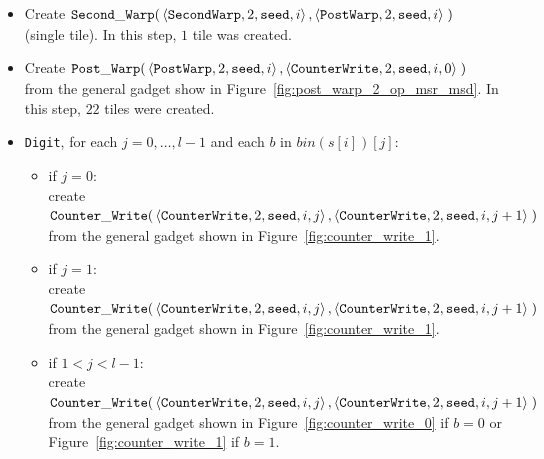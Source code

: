 \begin{itemize}
    \item Create
    $\begin{aligned}[t]
        {\tt Second\_Warp}(&\left\langle {\tt SecondWarp}, 2, {\tt seed}, i \right\rangle,
                     \left\langle {\tt PostWarp},   2, {\tt seed}, i \right\rangle \;)
    \end{aligned}$ \\ (single tile).
    In this step, $1$ tile was created.

    \item Create
    $\begin{aligned}[t]
        {\tt Post\_Warp}(&\left\langle {\tt PostWarp}, 2, {\tt seed}, i    \right\rangle,
                   \left\langle {\tt CounterWrite},    2, {\tt seed}, i, 0 \right\rangle \;)
    \end{aligned}$\\ from the general gadget show in Figure~\ref{fig:post_warp_2_op_msr_msd}.
    In this step, $22$ tiles were created.

    \item {\tt Digit}, for each $j=0,\ldots,l-1$ and each $b$ in $bin(s[i])[j]$:
    \begin{itemize}
        \item if $j = 0$:\\ create
        $\begin{aligned}[t]
            {\tt Counter\_Write}(&\left\langle {\tt CounterWrite}, 2, {\tt seed}, i, j \right\rangle, \left\langle {\tt CounterWrite}, 2, {\tt seed}, i, j + 1 \right\rangle \;)
        \end{aligned}$\\from the general gadget shown in Figure~\ref{fig:counter_write_1}.

        \item if $j = 1$:\\ create
        $\begin{aligned}[t]
            {\tt Counter\_Write}(&\left\langle {\tt CounterWrite}, 2, {\tt seed}, i, j \right\rangle, \left\langle {\tt CounterWrite}, 2, {\tt seed}, i, j + 1 \right\rangle \;)
        \end{aligned}$\\from the general gadget shown in Figure~\ref{fig:counter_write_1}.

        \item if $1 < j < l-1$:\\ create
        $\begin{aligned}[t]
            {\tt Counter\_Write}(&\left\langle {\tt CounterWrite}, 2, {\tt seed}, i, j \right\rangle, \left\langle {\tt CounterWrite}, 2, {\tt seed}, i, j + 1 \right\rangle \;)
        \end{aligned}$\\from the general gadget shown in Figure~\ref{fig:counter_write_0} if $b = 0$ or Figure~\ref{fig:counter_write_1} if $b = 1$.


\end{itemize}
\end{itemize}
